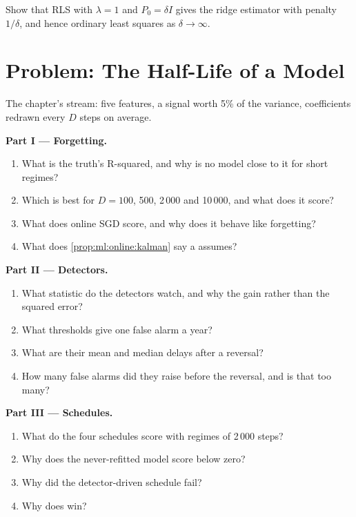 \begin{exercise}[$\star\star\star$]\label{exo:ml:online-learning-and-drift:8}
Show that RLS with $\lambda = 1$ and $P_0 = \delta I$ gives the ridge estimator with penalty $1/\delta$, and hence ordinary
least squares as $\delta\to\infty$.
\end{exercise}

\section{Problem: The Half-Life of a Model}

\begin{problem}\label{pb:ml:online-learning-and-drift:1}
The chapter's stream: five features, a signal worth 5\% of the variance, coefficients redrawn every $D$ steps on average.

\medskip\noindent\textbf{Part I --- Forgetting.}
\begin{enumerate}
\item What is the truth's R-squared, and why is no model close to it for short regimes?
\item Which  is best for $D = 100$, 500, 2\,000 and 10\,000, and what does it score?
\item What does online SGD score, and why does it behave like forgetting?
\item What does \cref{prop:ml:online:kalman} say a  assumes?
\end{enumerate}

\medskip\noindent\textbf{Part II --- Detectors.}
\begin{enumerate}[resume]
\item What statistic do the detectors watch, and why the gain rather than the squared error?
\item What thresholds give one false alarm a year?
\item What are their mean and median delays after a reversal?
\item How many false alarms did they raise before the reversal, and is that too many?
\end{enumerate}

\medskip\noindent\textbf{Part III --- Schedules.}
\begin{enumerate}[resume]
\item What do the four schedules score with regimes of 2\,000 steps?
\item Why does the never-refitted model score below zero?
\item Why did the detector-driven schedule fail?
\item Why does  win?
\end{enumerate}


\end{problem}
